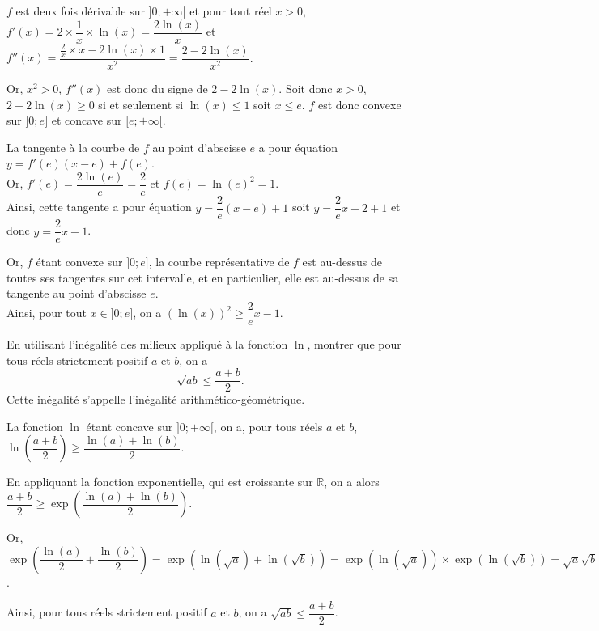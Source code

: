 \documentclass[11pt,fleqn, openany]{book} %
\begin{document}
\begin{solution}
$f$ est deux fois dérivable sur $]0;+\infty[$ et pour tout réel $x>0$, $f'(x)=2  \times \dfrac{1}{x} \times \ln (x)= \dfrac{2\ln(x)}{x}$ et $f''(x)=\dfrac{\frac{2}{x}\times x - 2\ln(x) \times 1}{x^2}=\dfrac{2-2\ln(x)}{x^2}$.

Or, $x^2>0$, $f''(x)$ est donc du signe de $2-2\ln(x)$. Soit donc $x>0$, $2-2\ln(x) \geqslant 0$ si et seulement si $\ln(x) \leqslant 1$ soit $x\leqslant e$. $f$ est donc convexe sur $]0;e]$ et concave sur $[e;+\infty[$.

La tangente à la courbe de $f$ au point d'abscisse $e$ a pour équation $y=f'(e)(x-e)+f(e)$. \\Or, $f'(e)=\dfrac{2\ln(e)}{e}=\dfrac{2}{e}$ et $f(e)=\ln(e)^2=1$. \\Ainsi, cette tangente a pour équation $y=\dfrac{2}{e}(x-e)+1$ soit $y=\dfrac{2}{e}x-2+1$ et donc $y=\dfrac{2}{e}x-1$. 

Or, $f$ étant convexe sur $]0;e]$, la courbe représentative de $f$ est au-dessus de toutes ses tangentes sur cet intervalle, et en particulier, elle est au-dessus de sa tangente au point d'abscisse $e$. \\ Ainsi, pour tout $x\in]0;e]$, on a $(\ln(x))^2 \geqslant \dfrac{2}{e}x-1$.\end{solution}



\begin{exercise}En utilisant l'inégalité des milieux appliqué à la fonction $\ln$, montrer que pour tous réels strictement positif $a$ et $b$, on a
\[ \sqrt{ab} \leqslant \dfrac{a+b}{2}.\]
Cette inégalité s'appelle l'inégalité arithmético-géométrique.\end{exercise}

\begin{solution}La fonction $\ln$ étant concave sur $]0;+\infty[$, on a, pour tous réels $a$ et $b$, $\ln\left(\dfrac{a+b}{2}\right)\geqslant \dfrac{\ln(a)+\ln(b)}{2}$. 

En appliquant la fonction exponentielle, qui est croissante sur $\mathbb{R}$, on a alors $\dfrac{a+b}{2}\geqslant \exp \left(\dfrac{\ln(a)+\ln(b)}{2}\right)$.

Or, $\exp\left(\dfrac{\ln(a)}{2}+\dfrac{\ln(b)}{2}\right)=\exp(\ln(\sqrt{a})+\ln(\sqrt{b}))=\exp(\ln(\sqrt{a}))\times \exp(\ln(\sqrt{b})) = \sqrt{a}\sqrt{b}=\sqrt{ab}$.

Ainsi, pour tous réels strictement positif $a$ et $b$, on a $\sqrt{ab} \leqslant \dfrac{a+b}{2}$.
\end{solution}
\end{document}

